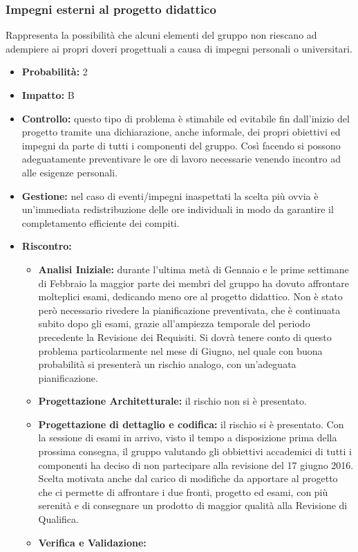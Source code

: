 \documentclass[a4paper,11pt]{article}
\begin{document}
		\subsubsection{Impegni esterni al progetto didattico}
		Rappresenta la possibilità che alcuni elementi del gruppo non riescano ad adempiere ai propri doveri progettuali a causa di impegni personali o universitari.
		\begin{itemize}
		\item \textbf{Probabilità:} 2
		\item \textbf{Impatto:} B
		\item \textbf{Controllo:} questo tipo di problema è stimabile ed evitabile fin dall'inizio del progetto tramite una dichiarazione, anche informale, dei propri obiettivi ed impegni da parte di tutti i componenti del gruppo. Così facendo si possono adeguatamente preventivare le ore di lavoro necessarie venendo incontro ad alle esigenze personali.
		\item \textbf{Gestione:} nel caso di eventi/impegni inaspettati la scelta più ovvia è un'immediata redistribuzione delle ore individuali in modo da garantire il completamento efficiente dei compiti.
		\item \textbf{Riscontro:}
			\begin{itemize}
				\item\textbf{Analisi Iniziale:} durante l'ultima metà di Gennaio e le prime settimane di Febbraio la maggior parte dei membri del gruppo ha dovuto affrontare molteplici esami, dedicando meno ore al progetto didattico. Non è stato però necessario rivedere la pianificazione preventivata, che è continuata subito dopo gli esami, grazie all'ampiezza temporale del periodo precedente la Revisione dei Requisiti. Si dovrà tenere conto di questo problema particolarmente nel mese di Giugno, nel quale con buona probabilità si presenterà un rischio analogo, con un'adeguata pianificazione.
				\item\textbf{Progettazione Architetturale:} il rischio non si è presentato.
				\item\textbf{Progettazione di dettaglio e codifica:} il rischio si è presentato. Con la sessione di esami in arrivo, visto il tempo a disposizione prima della prossima consegna, il gruppo valutando gli obbiettivi accademici di tutti i componenti ha deciso di non partecipare alla revisione del 17 giugno 2016. Scelta motivata anche dal carico di modifiche da apportare al progetto che ci permette di affrontare i due fronti, progetto ed esami, con più serenità e di consegnare un prodotto di maggior qualità alla Revisione di Qualifica.
				\item\textbf{Verifica e Validazione:}
			\end{itemize}
		\end{itemize}
\end{document}

